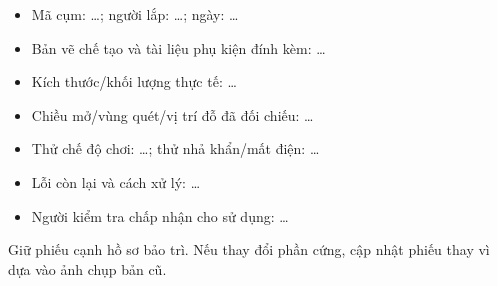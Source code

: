 \documentclass[
  11pt,
  a4paper,
]{article}
\providecommand{\tightlist}{%
  \setlength{\itemsep}{0pt}\setlength{\parskip}{0pt}}
\begin{document}
\begin{itemize}
\tightlist
\item
  Mã cụm: \ldots; người lắp: \ldots; ngày: \ldots{}
\item
  Bản vẽ chế tạo và tài liệu phụ kiện đính kèm: \ldots{}
\item
  Kích thước/khối lượng thực tế: \ldots{}
\item
  Chiều mở/vùng quét/vị trí đỗ đã đối chiếu: \ldots{}
\item
  Thử chế độ chơi: \ldots; thử nhả khẩn/mất điện: \ldots{}
\item
  Lỗi còn lại và cách xử lý: \ldots{}
\item
  Người kiểm tra chấp nhận cho sử dụng: \ldots{}
\end{itemize}

Giữ phiếu cạnh hồ sơ bảo trì. Nếu thay đổi phần cứng, cập nhật phiếu
thay vì dựa vào ảnh chụp bản cũ.
\end{document}
